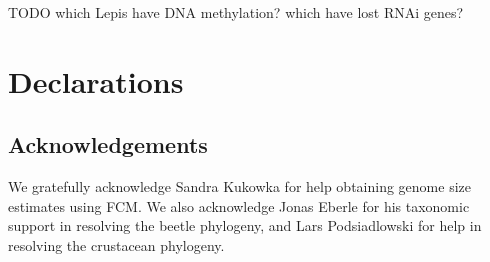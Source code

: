 TODO which Lepis have DNA methylation? which have lost RNAi genes?

\section{Declarations}

\subsection{Acknowledgements}

We gratefully acknowledge Sandra Kukowka for help obtaining genome size
estimates using FCM. We also acknowledge Jonas Eberle for his taxonomic
support in resolving the beetle phylogeny, and Lars Podsiadlowski for
help in resolving the crustacean phylogeny.
